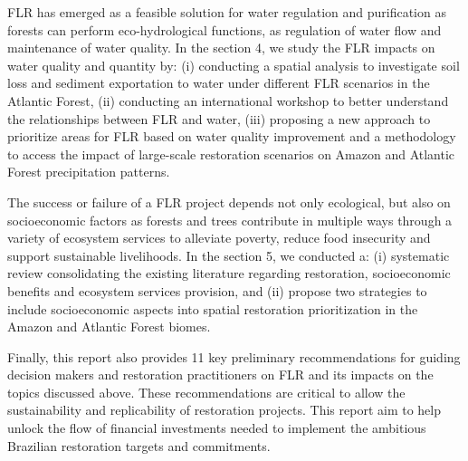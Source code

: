 FLR has emerged as a feasible solution for water regulation and purification as forests can perform eco-hydrological functions, as regulation of water flow and maintenance of water quality. In the section 4, we study the FLR impacts on water quality and quantity by: (i) conducting a spatial analysis to investigate soil loss and sediment exportation to water under different FLR scenarios in the Atlantic Forest, (ii) conducting an international workshop to better understand the relationships between FLR and water, (iii) proposing a new approach to prioritize areas for FLR based on water quality improvement and a methodology to access the impact of large-scale restoration scenarios on Amazon and Atlantic Forest precipitation patterns.

The success or failure of a FLR project depends not only ecological, but also on socioeconomic factors as forests and trees contribute in multiple ways through a variety of ecosystem services to alleviate poverty, reduce food insecurity and support sustainable livelihoods. In the section 5, we conducted a: (i) systematic review consolidating the existing literature regarding restoration, socioeconomic benefits and ecosystem services provision, and (ii) propose two strategies to include socioeconomic aspects into spatial restoration prioritization in the Amazon and Atlantic Forest biomes. 

Finally, this report also provides 11 key preliminary recommendations for guiding decision makers and restoration practitioners on FLR and its impacts on the topics discussed above. These recommendations are critical to allow the sustainability and replicability of restoration projects. This report aim to help unlock the flow of financial investments needed to implement the ambitious Brazilian restoration targets and commitments.